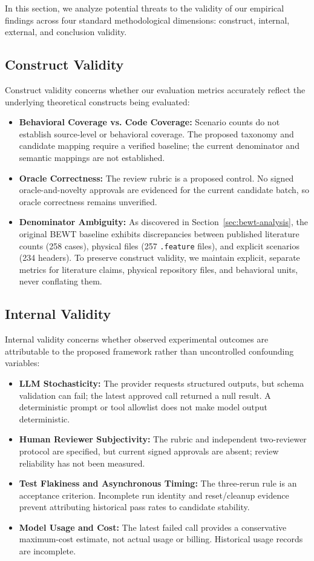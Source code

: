 \documentclass[pdflatex,sn-mathphys-num]{sn-jnl}
\begin{document}
In this section, we analyze potential threats to the validity of our empirical findings across four standard methodological dimensions: construct, internal, external, and conclusion validity.

\subsection{Construct Validity}

Construct validity concerns whether our evaluation metrics accurately reflect the underlying theoretical constructs being evaluated:
\begin{itemize}
    \item \textbf{Behavioral Coverage vs. Code Coverage:} Scenario counts do not establish source-level or behavioral coverage. The proposed taxonomy and candidate mapping require a verified baseline; the current denominator and semantic mappings are not established.
    \item \textbf{Oracle Correctness:} The review rubric is a proposed control. No signed oracle-and-novelty approvals are evidenced for the current candidate batch, so oracle correctness remains unverified.
    \item \textbf{Denominator Ambiguity:} As discovered in Section~\ref{sec:bewt-analysis}, the original BEWT baseline exhibits discrepancies between published literature counts (258 cases), physical files (257 \texttt{.feature} files), and explicit scenarios (234 headers). To preserve construct validity, we maintain explicit, separate metrics for literature claims, physical repository files, and behavioral units, never conflating them.
\end{itemize}

\subsection{Internal Validity}

Internal validity concerns whether observed experimental outcomes are attributable to the proposed framework rather than uncontrolled confounding variables:
\begin{itemize}
    \item \textbf{LLM Stochasticity:} The provider requests structured outputs, but schema validation can fail; the latest approved call returned a null result. A deterministic prompt or tool allowlist does not make model output deterministic.
    \item \textbf{Human Reviewer Subjectivity:} The rubric and independent two-reviewer protocol are specified, but current signed approvals are absent; review reliability has not been measured.
    \item \textbf{Test Flakiness and Asynchronous Timing:} The three-rerun rule is an acceptance criterion. Incomplete run identity and reset/cleanup evidence prevent attributing historical pass rates to candidate stability.
    \item \textbf{Model Usage and Cost:} The latest failed call provides a conservative maximum-cost estimate, not actual usage or billing. Historical usage records are incomplete.
\end{itemize}
\end{document}

